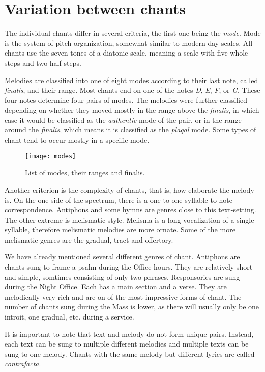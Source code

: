 \section{Variation between chants}

The individual chants differ in several criteria, the first one being the \emph{mode}. Mode is the system of pitch organization, somewhat similar to modern-day
scales. All chants use the seven tones of a diatonic scale, meaning a scale with five whole steps and two half steps.

Melodies are classified into one of eight modes according to their last note, called \emph{finalis}, and their range. Most chants
end on one of the notes \emph{D}, \emph{E}, \emph{F}, or \emph{G}. These four notes determine four pairs of modes. The melodies were further classified
depending on whether they moved mostly in the range above the \emph{finalis}, in which case it would be classified as the \emph{authentic} mode
of the pair, or in the range around the \emph{finalis}, which means it is classified as the \emph{plagal} mode. Some types of chant tend to
occur mostly in a specific mode.

\begin{figure}[h]
\centering
\texttt{[image: modes]}
\caption{List of modes, their ranges and finalis. \cite[p.~44]{chant_book}}
\end{figure}

Another criterion is the complexity of chants, that is, how elaborate the melody is. On the one side of the spectrum, there is a one-to-one
syllable to note correspondence. Antiphons and some hymns are genres close to this text-setting. The other extreme is melismatic style. Melisma
is a long vocalization of a single syllable, therefore melismatic melodies are more ornate. Some of the more melismatic genres are the gradual,
tract and offertory.

We have already mentioned several different genres of chant. Antiphons are chants sung to frame a psalm during the Office hours. They are relatively
short and simple, somtimes consisting of only two phrases. Responsories are sung during the Night Office. Each has a main section and a verse. They are
melodically very rich and are on of the most impressive forms of chant. The number of chants sung during the Mass is lower, as there will usually
only be one introit, one gradual, etc. during a service.

It is important to note that text and melody do not form unique pairs. Instead, each text
can be sung to multiple different melodies and multiple texts can be sung to one melody. Chants with the same melody but different lyrics
are called \emph{contrafacta}.

